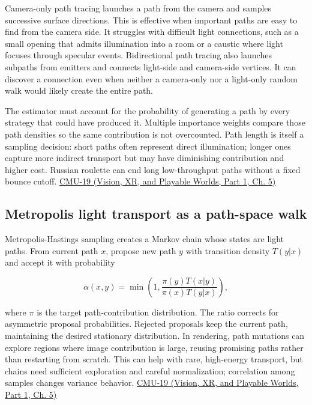 Camera-only path tracing launches a path from the camera and samples successive surface directions. This is effective when important paths are easy to find from the camera side. It struggles with difficult light connections, such as a small opening that admits illumination into a room or a caustic where light focuses through specular events. Bidirectional path tracing also launches subpaths from emitters and connects light-side and camera-side vertices. It can discover a connection even when neither a camera-only nor a light-only random walk would likely create the entire path.

The estimator must account for the probability of generating a path by every strategy that could have produced it. Multiple importance weights compare those path densities so the same contribution is not overcounted. Path length is itself a sampling decision: short paths often represent direct illumination; longer ones capture more indirect transport but may have diminishing contribution and higher cost. Russian roulette can end long low-throughput paths without a fixed bounce cutoff. \href{../07-Vision-XR-and-Playable-Worlds-P01/main.pdf\#nameddest=04-visual-computing-ii-ch036-cmu-19---variance-reduction}{CMU-19 (Vision, XR, and Playable Worlds, Part 1, Ch. 5)}

\subsection{Metropolis light transport as a path-space walk}\label{03-visual-computing-i-ch011-metropolis-light-transport-as-a-path-space-walk}

\hypertarget{03-visual-computing-i-ch011-metropolis-light-transport-as-a-path-space-walk}{}

Metropolis-Hastings sampling creates a Markov chain whose states are light paths. From current path \(x\), propose new path \(y\) with transition density \(T(y|x)\) and accept it with probability

\[
\alpha(x,y)=\min\left(1,\frac{\pi(y)T(x|y)}{\pi(x)T(y|x)}\right),
\]

where \(\pi\) is the target path-contribution distribution. The ratio corrects for asymmetric proposal probabilities. Rejected proposals keep the current path, maintaining the desired stationary distribution. In rendering, path mutations can explore regions where image contribution is large, reusing promising paths rather than restarting from scratch. This can help with rare, high-energy transport, but chains need sufficient exploration and careful normalization; correlation among samples changes variance behavior. \href{../07-Vision-XR-and-Playable-Worlds-P01/main.pdf\#nameddest=04-visual-computing-ii-ch036-cmu-19---variance-reduction}{CMU-19 (Vision, XR, and Playable Worlds, Part 1, Ch. 5)}

